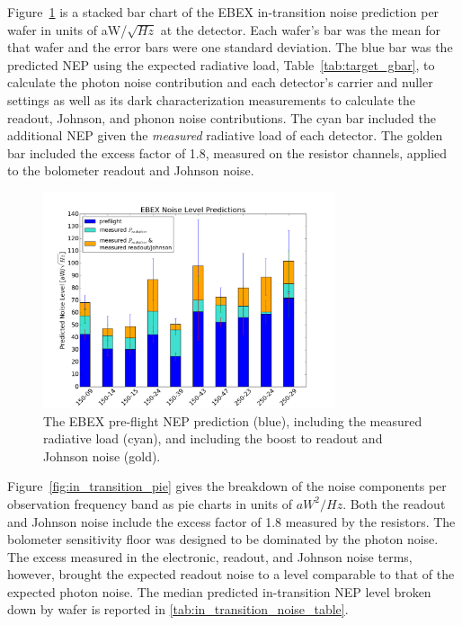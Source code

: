 Figure~\ref{fig:prediction_bar_chart} is a stacked bar chart of the \ac{EBEX} in-transition noise prediction per wafer in units of aW/$\sqrt{Hz}$ at the detector. 
Each wafer's bar was the mean for that wafer and the error bars were one standard deviation. 
The blue bar was the predicted \ac{NEP} using the expected radiative load, Table~\ref{tab:target_gbar}, to calculate the photon noise contribution and each detector's carrier and nuller settings as well as its dark characterization measurements to calculate the readout, Johnson, and phonon noise contributions. 
The cyan bar included the additional \ac{NEP} given the \textit{measured} radiative load of each detector. 
The golden bar included the excess factor of 1.8, measured on the resistor channels, applied to the bolometer readout and Johnson noise. 


\begin{figure}[ht!]
\begin{center}
\includegraphics[height=2.5in]{figures/ebex_noise_level_predictions_barchart_per_wafer}
\caption[In-transition noise prediction per wafer]{The \ac{EBEX} pre-flight \ac{NEP} prediction (blue), including the measured radiative load (cyan), and including the boost to readout and Johnson noise (gold).
\label{fig:prediction_bar_chart} }
\end{center}
\end{figure}

Figure~\ref{fig:in_transition_pie} gives the breakdown of the noise components per observation frequency band as pie charts in units of $aW^2/Hz$.
Both the readout and Johnson noise include the excess factor of 1.8 measured by the resistors. 
The bolometer sensitivity floor was designed to be dominated by the photon noise. 
The excess measured in the electronic, readout, and Johnson noise terms, however, brought the expected readout noise to a level comparable to that of the expected photon noise. 
The median predicted in-transition \ac{NEP} level broken down by wafer is reported in \TAB\ref{tab:in_transition_noise_table}. 

